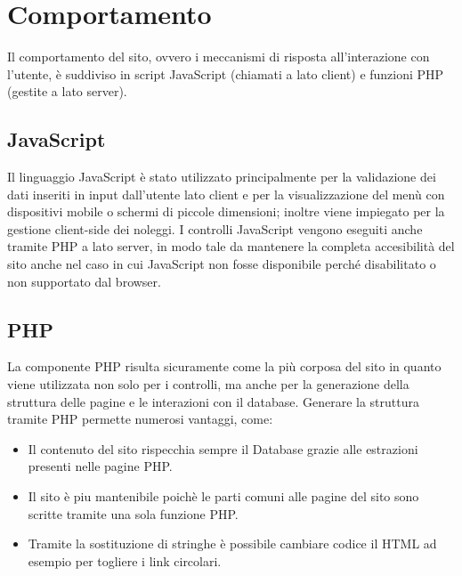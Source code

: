 \section{Comportamento}
Il comportamento del sito, ovvero i meccanismi di risposta all'interazione con l'utente, è suddiviso in script JavaScript (chiamati a lato client) e funzioni PHP (gestite a lato server).
    \subsection{JavaScript}
        Il linguaggio JavaScript è stato utilizzato principalmente per la validazione dei dati inseriti in input dall'utente lato client e per la visualizzazione del menù con dispositivi mobile o schermi di piccole dimensioni; inoltre viene impiegato per la gestione client-side dei noleggi.
        I controlli JavaScript vengono eseguiti anche tramite PHP a lato server, in modo tale da mantenere la completa accesibilità del sito anche nel caso in cui JavaScript non fosse disponibile perché disabilitato o non supportato dal browser.
    \subsection{PHP}
        La componente PHP risulta sicuramente come la più corposa del sito in quanto viene utilizzata non solo per i controlli, ma anche per la generazione della struttura delle pagine e le interazioni con il database.
        Generare la struttura tramite PHP permette numerosi vantaggi, come:
        \begin{itemize}
            \item Il contenuto del sito rispecchia sempre il Database grazie alle estrazioni presenti nelle pagine PHP.
            \item Il sito è piu mantenibile poichè le parti comuni alle pagine del sito sono scritte tramite una sola funzione PHP.
            \item Tramite la sostituzione di stringhe è possibile cambiare codice il HTML ad esempio per togliere i link circolari.
        \end{itemize}
\pagebreak
